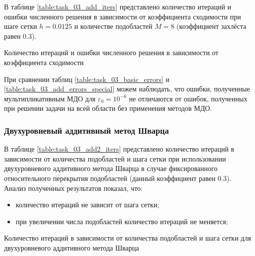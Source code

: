 \documentclass[a4paper]{article}
\begin{document}
В таблице \ref{table:task_03_add_iters} представлено количество итераций и ошибки численного решения в зависимости от коэффициента сходимости при шаге сетки $h = 0.0125$ и количестве подобластей $M = 8$ (коэффициент захлёста равен 0.3).

\begin{table}[h]
\caption{Количество итераций и ошибки численного решения в зависимости от коэффициента сходимости}
\label{table:task_03_add_errors_special}
\end{table}

При сравнении таблиц \ref{table:task_03_basic_errors} и \ref{table:task_03_add_errors_special} можем наблюдать, что ошибки, полученные мультипликативным МДО для $\varepsilon_0 = 10^{-6}$ не отличаются от ошибок, полученных при решении задачи на всей области без применения методов МДО. 

\newpage

\subsubsection{Двухуровневый аддитивный метод Шварца}

В таблице \ref{table:task_03_add2_iters} представлено количество итераций в зависимости от количества подобластей и шага сетки при использовании двухуровневого аддитивного метода Шварца в случае фиксированного относительного перекрытия подобластей (данный коэффициент равен 0.3). Анализ полученных результатов показал, что:
\begin{itemize}
\item количество итераций не зависит от шага сетки;
\item при увеличении числа подобластей количество итераций не меняется;
\end{itemize}

\begin{table}[h]
\caption{Количество итераций в зависимости от количества подобластей и шага сетки для двухуровневого аддитивного метода Шварца}
\label{table:task_03_add2_iters}
\end{table}
\end{document}
